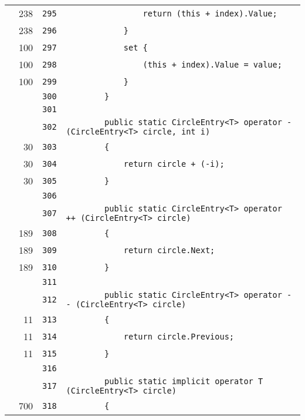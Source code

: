 \documentclass[a4paper,10pt]{article}
\begin{document}
\begin{longtable}[l]{lrrl}
\cellcolor{green} & 238 & \verb~295~ & \verb~                return (this + index).Value;~\\
\cellcolor{green} & 238 & \verb~296~ & \verb~            }~\\
\cellcolor{green} & 100 & \verb~297~ & \verb~            set {~\\
\cellcolor{green} & 100 & \verb~298~ & \verb~                (this + index).Value = value;~\\
\cellcolor{green} & 100 & \verb~299~ & \verb~            }~\\
\cellcolor{gray} &  & \verb~300~ & \verb~        }~\\
\cellcolor{gray} &  & \verb~301~ & \verb~~\\
\cellcolor{gray} &  & \verb~302~ & \verb~        public static CircleEntry<T> operator - (CircleEntry<T> circle, int i)~\\
\cellcolor{green} & 30 & \verb~303~ & \verb~        {~\\
\cellcolor{green} & 30 & \verb~304~ & \verb~            return circle + (-i);~\\
\cellcolor{green} & 30 & \verb~305~ & \verb~        }~\\
\cellcolor{gray} &  & \verb~306~ & \verb~~\\
\cellcolor{gray} &  & \verb~307~ & \verb~        public static CircleEntry<T> operator ++ (CircleEntry<T> circle)~\\
\cellcolor{green} & 189 & \verb~308~ & \verb~        {~\\
\cellcolor{green} & 189 & \verb~309~ & \verb~            return circle.Next;~\\
\cellcolor{green} & 189 & \verb~310~ & \verb~        }~\\
\cellcolor{gray} &  & \verb~311~ & \verb~~\\
\cellcolor{gray} &  & \verb~312~ & \verb~        public static CircleEntry<T> operator -- (CircleEntry<T> circle)~\\
\cellcolor{green} & 11 & \verb~313~ & \verb~        {~\\
\cellcolor{green} & 11 & \verb~314~ & \verb~            return circle.Previous;~\\
\cellcolor{green} & 11 & \verb~315~ & \verb~        }~\\
\cellcolor{gray} &  & \verb~316~ & \verb~~\\
\cellcolor{gray} &  & \verb~317~ & \verb~        public static implicit operator T (CircleEntry<T> circle)~\\
\cellcolor{green} & 700 & \verb~318~ & \verb~        {~\\

\end{longtable}
\end{document}
